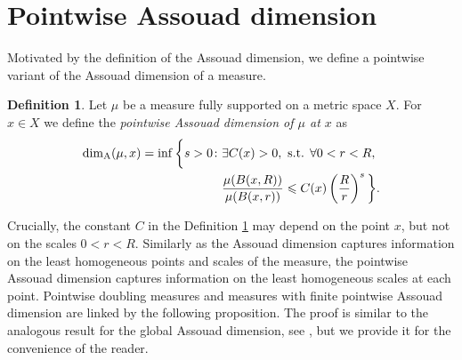 \documentclass{PRM}
\theoremstyle{plain}
\theoremstyle{definition}
\newtheorem{defn}[thm]{Definition}
\theoremstyle{remark}
\begin{document}
\section{Pointwise Assouad dimension}\label{sec:pw_assouad}
Motivated by the definition of the Assouad dimension, we define a pointwise variant of the Assouad dimension of a measure.

\begin{defn}\label{def:loc_assouad}
Let $\mu$ be a measure fully supported on a metric space $X$. For $x\in X$ we define the \emph{pointwise Assouad dimension of $\mu$ at $x$} as
\begin{align*}
    \dim_{\mathrm{A}}(\mu,x)=\inf\bigg\{s>0\colon &\exists C(x)>0,\textnormal{ s.t. }\forall0<r<R,\\
    &\frac{\mu(B(x,R))}{\mu(B(x,r))}\leq C(x)\left(\frac{R}{r}\right)^s\bigg\}.
\end{align*}
\end{defn}
Crucially, the constant $C$ in the Definition \ref{def:loc_assouad} may depend on the point $x$, but not on the scales $0<r<R$. Similarly as the Assouad dimension captures information on the least homogeneous points and scales of the measure, the pointwise Assouad dimension captures information on the least homogeneous scales at each point. Pointwise doubling measures and measures with finite pointwise Assouad dimension are linked by the following proposition. The proof is similar to the analogous result for the global Assouad dimension, see \cite[Lemma 4.1.1]{F}, but we provide it for the convenience of the reader.
\end{document}
